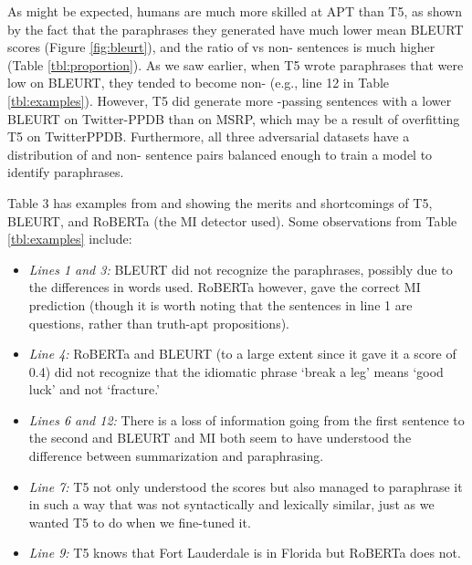 As might be expected, humans are much more skilled at APT than T5, as shown by the fact that the paraphrases they generated have much lower mean BLEURT scores (Figure \ref{fig:bleurt}), and the ratio of  vs non- sentences is much higher (Table \ref{tbl:proportion}). As we saw earlier, when T5 wrote paraphrases that were low on BLEURT, they tended to become non- (e.g., line 12 in Table \ref{tbl:examples}). However, T5 did generate more -passing sentences with a lower BLEURT on Twitter-PPDB than on MSRP, which may be a result of overfitting T5 on TwitterPPDB. Furthermore, all three adversarial datasets have a distribution of  and non- sentence pairs balanced enough to train a model to identify paraphrases.

Table 3 has examples from  and  showing the merits and shortcomings of T5, BLEURT, and RoBERTa (the MI detector used). Some observations from Table \ref{tbl:examples} include:
\begin{itemize}
    \item \textit{Lines 1 and 3:} BLEURT did not recognize the paraphrases, possibly due to the differences in words used. RoBERTa however, gave the correct MI prediction (though it is worth noting that the sentences in line 1 are questions, rather than truth-apt propositions).
    \item \textit{Line 4:} RoBERTa and BLEURT (to a large extent since it gave it a score of 0.4) did not recognize that the idiomatic phrase `break a leg' means `good luck' and not `fracture.'
    \item \textit{Lines 6 and 12:} There is a loss of information going from the first sentence to the second and BLEURT and MI both seem to have understood the difference between summarization and paraphrasing.
    \item \textit{Line 7:} T5 not only understood the scores but also managed to paraphrase it in such a way that was not syntactically and lexically similar, just as we wanted T5 to do when we fine-tuned it.
    \item \textit{Line 9:} T5 knows that Fort Lauderdale is in Florida but RoBERTa does not.
\end{itemize}

%
